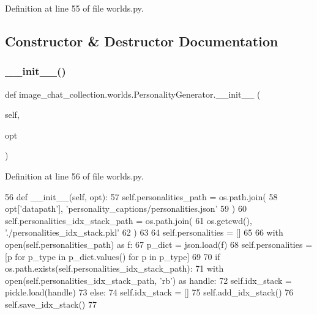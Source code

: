 Definition at line 55 of file worlds.\+py.



\subsection{Constructor \& Destructor Documentation}
\mbox{\label{classimage__chat__collection_1_1worlds_1_1PersonalityGenerator_aea4fe82298d9fea4e7b20b3380a47c99}} 
\subsubsection{\texorpdfstring{\+\_\+\+\_\+init\+\_\+\+\_\+()}{\_\_init\_\_()}}
{\footnotesize\ttfamily def image\+\_\+chat\+\_\+collection.\+worlds.\+Personality\+Generator.\+\_\+\+\_\+init\+\_\+\+\_\+ (\begin{DoxyParamCaption}\item[{}]{self,  }\item[{}]{opt }\end{DoxyParamCaption})}



Definition at line 56 of file worlds.\+py.


\begin{DoxyCode}
56     \textcolor{keyword}{def }\_\_init\_\_(self, opt):
57         self.personalities\_path = os.path.join(
58             opt[\textcolor{stringliteral}{'datapath'}], \textcolor{stringliteral}{'personality\_captions/personalities.json'}
59         )
60         self.personalities\_idx\_stack\_path = os.path.join(
61             os.getcwd(), \textcolor{stringliteral}{'./personalities\_idx\_stack.pkl'}
62         )
63 
64         self.personalities = []
65 
66         with open(self.personalities\_path) \textcolor{keyword}{as} f:
67             p\_dict = json.load(f)
68             self.personalities = [p \textcolor{keywordflow}{for} p\_type \textcolor{keywordflow}{in} p\_dict.values() \textcolor{keywordflow}{for} p \textcolor{keywordflow}{in} p\_type]
69 
70         \textcolor{keywordflow}{if} os.path.exists(self.personalities\_idx\_stack\_path):
71             with open(self.personalities\_idx\_stack\_path, \textcolor{stringliteral}{'rb'}) \textcolor{keyword}{as} handle:
72                 self.idx\_stack = pickle.load(handle)
73         \textcolor{keywordflow}{else}:
74             self.idx\_stack = []
75             self.add\_idx\_stack()
76             self.save\_idx\_stack()
77 
\end{DoxyCode}


